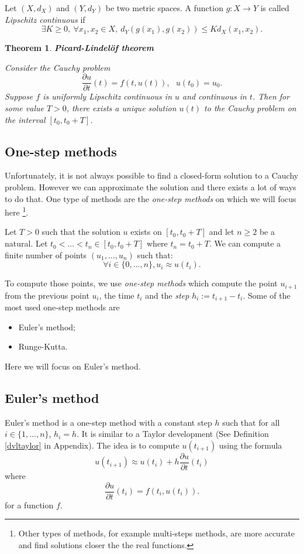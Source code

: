 \documentclass[10pt,a4paper]{article}
\theoremstyle{definition}
\theoremstyle{plain}
\newtheorem{theorem}{Theorem}
\begin{document}
Let $(X, d_X)$ and $(Y, d_Y)$ be two metric spaces.  
A function $g: X \rightarrow  Y$ is called \textit{Lipschitz continuous} if
$$
\exists K \geq 0, \  \forall x_1, x_2 \in X, \  d_Y(g(x_1), g(x_2)) \leq Kd_X(x_1, x_2).
$$

\begin{theorem}{\textbf{Picard-Lindelöf theorem}}\label{exiunique}

Consider the Cauchy problem
$$
\frac{\partial u}{\partial t} (t) = f(t, u(t)), \ \ \ u(t_0) = u_0.
$$
Suppose $f$ is uniformly Lipschitz continuous in $u$ and continuous in $t$. Then for some value $T > 0$, there exists a unique solution $u(t)$ to the Cauchy problem on the interval $[t_0, t_0 + T]$. 
\end{theorem}

\subsection{One-step methods}
Unfortunately, it is not always possible to find a closed-form solution to a Cauchy problem.
However we can approximate the solution and there exists a lot of ways to do that. One type of methods are the \textit{one-step methods} on which we will focus here \footnote{Other types of methods, for example multi-steps methods, are more accurate and find solutions closer the the real functions.}.

Let $T > 0$ such that the solution $u$ exists on $[t_0, t_0 + T]$ and let $n \geqslant 2$ be a natural. Let  $t_0 < ... < t_n \in [t_0, t_0 + T]$ where $t_n = t_0 + T$. We can compute a finite number of points $(u_1, \dots, u_n)$ such that:
$$
\forall i\in \{0,\dots, n\},  u_i \approx u(t_i).
$$

To compute those points, we use \textit{one-step methods} which compute the point $u_{i+1}$ from the previous point $u_i$, the time $t_i$ and the \textit{step} $h_i := t_{i+1} - t_i$. Some of the most used one-step methods are
\begin{itemize}
\item Euler's method;
\item Runge-Kutta.
\end{itemize}

Here we will focus on Euler's method.

\subsection{Euler's method} \label{euler}
Euler's method is a one-step method with a constant step $h$ such that for all $i \in \{1, \dots, n\}$, $h_i = h$. It is similar to a Taylor development (See Definition \ref{dvltaylor} in Appendix). The idea is to compute $u(t_{i+1})$ using the formula
\begin{equation}\label{eqeuler}
u(t_{i+1}) \approx u(t_i) + h\frac{\partial u}{\partial t}(t_i)
\end{equation}
where 
$$
\frac{\partial u}{\partial t}(t_i) = f(t_i, u(t_i)).
$$
for a function $f$.
\end{document}
